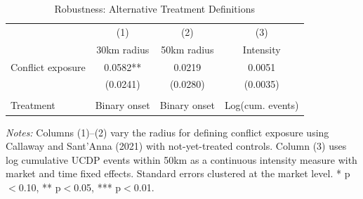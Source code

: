\begin{table}[H]
\centering
\caption{Robustness: Alternative Treatment Definitions}
\label{tab:robustness}
\begin{threeparttable}
\begin{tabular}{lccc}
\toprule
 & (1) & (2) & (3) \\
 & 30km radius & 50km radius & Intensity \\
\midrule
Conflict exposure & 0.0582** & 0.0219 & 0.0051 \\
 & (0.0241) & (0.0280) & (0.0035) \\
\\
Treatment & Binary onset & Binary onset & Log(cum. events) \\
\bottomrule
\end{tabular}
\begin{tablenotes}[flushleft]
\small
\item \textit{Notes:} Columns (1)--(2) vary the radius for defining conflict exposure using Callaway and Sant'Anna (2021) with not-yet-treated controls. Column (3) uses log cumulative UCDP events within 50km as a continuous intensity measure with market and time fixed effects. Standard errors clustered at the market level. * p$<$0.10, ** p$<$0.05, *** p$<$0.01.
\end{tablenotes}
\end{threeparttable}
\end{table}
